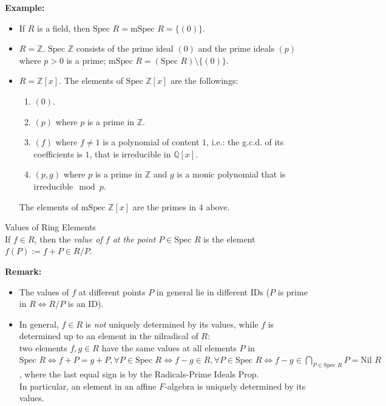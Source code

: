 \noindent\textbf{Example:} \begin{itemize}
    \item If $R$ is a field, then $\text{Spec }R=\text{mSpec }R =\{(0)\}$.
    \item $R=\mathbb{Z}$. $\text{Spec }\mathbb{Z}$ consists of the prime ideal $(0)$ and the prime ideals $(p)$ where $p>0$ is a prime; $\text{mSpec }R= (\text{Spec }R) \setminus \{(0)\}$.

    \item $R= \mathbb{Z} [x]$. The elements of $\text{Spec }\mathbb{Z} [x]$ are the followings:
    \begin{enumerate}
        \item $(0)$.
        \item $(p)$ where $p$ is a prime in $\mathbb{Z}$.
        \item $(f)$ where $f\neq 1$ is a polynomial of content $1$, i.e.: the g.c.d. of its coefficients is $1$, that is irreducible in $\mathbb{Q} [x]$.
        \item $(p,g)$ where $p$ is a prime in $\mathbb{Z}$ and $g$ is a monic polynomial that is irreducible$\mod{p}$.
    \end{enumerate}
    The elements of $\text{mSpec }\mathbb{Z} [x]$ are the primes in $4$ above.
\end{itemize}

\begin{definition}{Values of Ring Elements}\\
If $f \in R$, then the \textit{value of $f$ at the point $P \in \text{Spec }R$} is the element $f(P):= f+P \in R/P$.
\end{definition}

\noindent\textbf{Remark:} \begin{itemize}
    \item The values of $f$ at different points $P$ in general lie in different IDs ($P$ is prime in $R \Leftrightarrow R/P$ is an ID).

    \item In general, $f\in R$ is \textit{not} uniquely determined by its values, while $f$ is determined up to an element in the nilradical of $R$:\\
    two elements $f,g \in R$ have the same values at all elements $P$ in $\text{Spec }R \Leftrightarrow f+P=g+P ,\forall P\in \text{Spec }R \Leftrightarrow f-g \in R ,\forall P\in \text{Spec }R \Leftrightarrow f-g\in \bigcap_{P \in \text{Spec }R}P = \text{Nil }R$, where the last equal sign is by the Radicals-Prime Ideals Prop.\\
    In particular, an element in an affine $F$-algebra is uniquely determined by its values.
\end{itemize}

